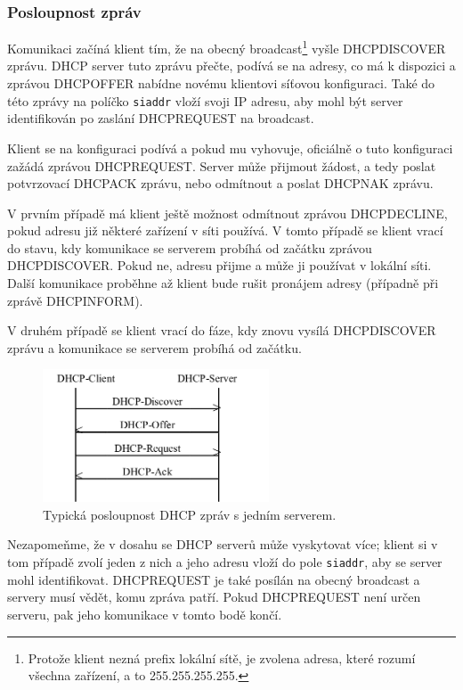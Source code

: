 \documentclass[a4paper, 11pt, hidelinks]{article}
\begin{document}
\subsubsection{Posloupnost zpráv}\label{1_2_2_posloupnost}

Komunikaci začíná klient tím, že na obecný broadcast\footnote[4]{Protože klient nezná prefix lokální sítě, je zvolena adresa, které rozumí všechna zařízení, a to 255.255.255.255.} vyšle DHCPDISCOVER zprávu.
DHCP server tuto zprávu přečte, podívá se na adresy, co má k dispozici a zprávou DHCPOFFER nabídne novému klientovi síťovou konfiguraci.
Také do této zprávy na políčko \texttt{siaddr} vloží svoji IP adresu, aby mohl být server identifikován po zaslání DHCPREQUEST na broadcast.

Klient se na konfiguraci podívá a pokud mu vyhovuje, oficiálně o tuto konfiguraci zažádá zprávou DHCPREQUEST.
Server může přijmout žádost, a tedy poslat potvrzovací DHCPACK zprávu, nebo odmítnout a poslat DHCPNAK zprávu.

V prvním případě má klient ještě možnost odmítnout zprávou DHCPDECLINE, pokud adresu již některé zařízení v síti používá.
V tomto případě se klient vrací do stavu, kdy komunikace se serverem probíhá od začátku zprávou DHCPDISCOVER.
Pokud ne, adresu přijme a může ji používat v lokální síti.
Další komunikace proběhne až klient bude rušit pronájem adresy (případně při zprávě DHCPINFORM).

V druhém případě se klient vrací do fáze, kdy znovu vysílá DHCPDISCOVER zprávu a komunikace se serverem probíhá od začátku.

\begin{figure}[h]
    \centering
    \includegraphics[width=0.6\textwidth]{img/Typical-DHCP-sequence.png}
    \caption{Typická posloupnost DHCP zpráv s jedním serverem.\cite{dhcp-message-sequence}}
    \label{pic:dhcp_sequence}
\end{figure}

Nezapomeňme, že v dosahu se DHCP serverů může vyskytovat více; klient si v tom případě zvolí jeden z nich a jeho adresu vloží do pole \texttt{siaddr}, aby se server mohl identifikovat.
DHCPREQUEST je také posílán na obecný broadcast a servery musí vědět, komu zpráva patří.
Pokud DHCPREQUEST není určen serveru, pak jeho komunikace v tomto bodě končí.
\end{document}
